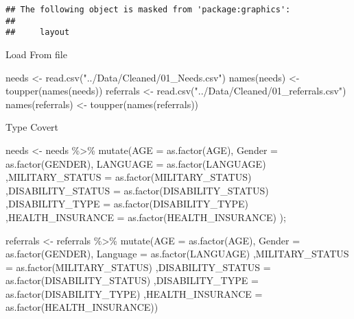 \documentclass[
]{article}
\newenvironment{Shaded}{\begin{snugshade}}{\end{snugshade}}
\newcommand{\AttributeTok}[1]{\textcolor[rgb]{0.77,0.63,0.00}{#1}}
\newcommand{\FunctionTok}[1]{\textcolor[rgb]{0.00,0.00,0.00}{#1}}
\newcommand{\NormalTok}[1]{#1}
\newcommand{\OtherTok}[1]{\textcolor[rgb]{0.56,0.35,0.01}{#1}}
\newcommand{\SpecialCharTok}[1]{\textcolor[rgb]{0.00,0.00,0.00}{#1}}
\newcommand{\StringTok}[1]{\textcolor[rgb]{0.31,0.60,0.02}{#1}}
\begin{document}
\begin{verbatim}
## The following object is masked from 'package:graphics':
## 
##     layout
\end{verbatim}

Load From file

\begin{Shaded}
\begin{Highlighting}[]
\NormalTok{needs }\OtherTok{\textless{}{-}} \FunctionTok{read.csv}\NormalTok{(}\StringTok{"../Data/Cleaned/01\_Needs.csv"}\NormalTok{)}
\FunctionTok{names}\NormalTok{(needs) }\OtherTok{\textless{}{-}} \FunctionTok{toupper}\NormalTok{(}\FunctionTok{names}\NormalTok{(needs))}
\NormalTok{referrals }\OtherTok{\textless{}{-}} \FunctionTok{read.csv}\NormalTok{(}\StringTok{"../Data/Cleaned/01\_referrals.csv"}\NormalTok{)}
\FunctionTok{names}\NormalTok{(referrals) }\OtherTok{\textless{}{-}} \FunctionTok{toupper}\NormalTok{(}\FunctionTok{names}\NormalTok{(referrals))}
\end{Highlighting}
\end{Shaded}

Type Covert

\begin{Shaded}
\begin{Highlighting}[]
\NormalTok{needs }\OtherTok{\textless{}{-}}\NormalTok{ needs }\SpecialCharTok{\%\textgreater{}\%} \FunctionTok{mutate}\NormalTok{(}\AttributeTok{AGE =} \FunctionTok{as.factor}\NormalTok{(AGE), }\AttributeTok{Gender =} \FunctionTok{as.factor}\NormalTok{(GENDER), }\AttributeTok{LANGUAGE =} \FunctionTok{as.factor}\NormalTok{(LANGUAGE)}
\NormalTok{                          ,}\AttributeTok{MILITARY\_STATUS =} \FunctionTok{as.factor}\NormalTok{(MILITARY\_STATUS)}
\NormalTok{                          ,}\AttributeTok{DISABILITY\_STATUS =} \FunctionTok{as.factor}\NormalTok{(DISABILITY\_STATUS)}
\NormalTok{                          ,}\AttributeTok{DISABILITY\_TYPE =} \FunctionTok{as.factor}\NormalTok{(DISABILITY\_TYPE)}
\NormalTok{                          ,}\AttributeTok{HEALTH\_INSURANCE =} \FunctionTok{as.factor}\NormalTok{(HEALTH\_INSURANCE)}
\NormalTok{                          );}

\NormalTok{referrals }\OtherTok{\textless{}{-}}\NormalTok{ referrals }\SpecialCharTok{\%\textgreater{}\%} \FunctionTok{mutate}\NormalTok{(}\AttributeTok{AGE =} \FunctionTok{as.factor}\NormalTok{(AGE), }\AttributeTok{Gender =} \FunctionTok{as.factor}\NormalTok{(GENDER), }\AttributeTok{Language =} \FunctionTok{as.factor}\NormalTok{(LANGUAGE)}
\NormalTok{                          ,}\AttributeTok{MILITARY\_STATUS =} \FunctionTok{as.factor}\NormalTok{(MILITARY\_STATUS)}
\NormalTok{                          ,}\AttributeTok{DISABILITY\_STATUS =} \FunctionTok{as.factor}\NormalTok{(DISABILITY\_STATUS)}
\NormalTok{                          ,}\AttributeTok{DISABILITY\_TYPE =} \FunctionTok{as.factor}\NormalTok{(DISABILITY\_TYPE)}
\NormalTok{                          ,}\AttributeTok{HEALTH\_INSURANCE =} \FunctionTok{as.factor}\NormalTok{(HEALTH\_INSURANCE))}
\end{Highlighting}
\end{Shaded}
\end{document}
